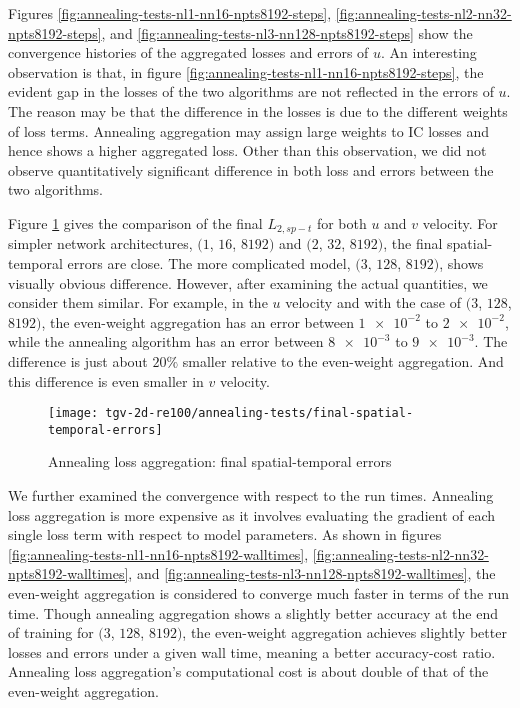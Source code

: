 Figures \ref{fig:annealing-tests-nl1-nn16-npts8192-steps}, \ref{fig:annealing-tests-nl2-nn32-npts8192-steps}, and \ref{fig:annealing-tests-nl3-nn128-npts8192-steps} show the convergence histories of the aggregated losses and errors of $u$.
An interesting observation is that, in figure \ref{fig:annealing-tests-nl1-nn16-npts8192-steps}, the evident gap in the losses of the two algorithms are not reflected in the errors of $u$.
The reason may be that the difference in the losses is due to the different weights of loss terms.
Annealing aggregation may assign large weights to IC losses and hence shows a higher aggregated loss.
Other than this observation, we did not observe quantitatively significant difference in both loss and errors between the two algorithms.

Figure \ref{fig:annealing-tests-final-sterrs} gives the comparison of the final $L_{2,sp-t}$ for both $u$ and $v$ velocity.
For simpler network architectures, $(1$, $16$, $8192)$ and $(2$, $32$, $8192)$, the final spatial-temporal errors are close.
The more complicated model, $(3$, $128$, $8192)$, shows visually obvious difference.
However, after examining the actual quantities, we consider them similar.
For example, in the $u$ velocity and with the case of $(3$, $128$, $8192)$, the even-weight aggregation has an error between $\num{1e-2}$ to $\num{2e-2}$, while the annealing algorithm has an error between $\num{8e-3}$ to $\num{9e-3}$.
The difference is just about $20\%$ smaller relative to the even-weight aggregation.
And this difference is even smaller in $v$ velocity.

\begin{figure}[hbt!]
    \centering%
    \texttt{[image: tgv-2d-re100/annealing-tests/final-spatial-temporal-errors]}%
    \caption[%
        Annealing loss aggregation: final spatial-temporal errors%
    ]{%
        Annealing loss aggregation: final spatial-temporal errors%
    }\label{fig:annealing-tests-final-sterrs}%
\end{figure}

We further examined the convergence with respect to the run times.
Annealing loss aggregation is more expensive as it involves evaluating the gradient of each single loss term with respect to model parameters.
As shown in figures \ref{fig:annealing-tests-nl1-nn16-npts8192-walltimes}, \ref{fig:annealing-tests-nl2-nn32-npts8192-walltimes}, and \ref{fig:annealing-tests-nl3-nn128-npts8192-walltimes}, the even-weight aggregation is considered to converge much faster in terms of the run time.
Though annealing aggregation shows a slightly better accuracy at the end of training for $(3$, $128$, $8192)$, the even-weight aggregation achieves slightly better losses and errors under a given wall time, meaning a better accuracy-cost ratio.
Annealing loss aggregation's computational cost is about double of that of the even-weight aggregation. 

